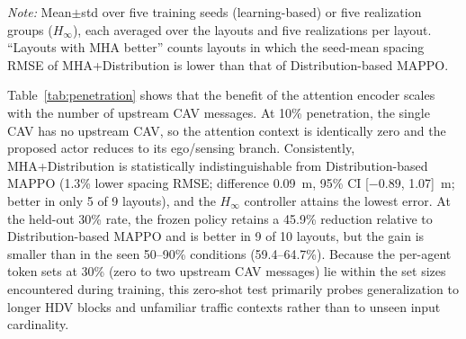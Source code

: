 \documentclass{ieeeaccess}
\begin{document}
\begin{table}[htbp]
\centering
\caption{Spacing RMSE (m) Across Seen and Zero-Shot CAV Penetration Rates (30\% Bernoulli Loss, Averaged over Layouts)}
\label{tab:penetration}
\setlength{\tabcolsep}{4pt}
\renewcommand{\arraystretch}{1.2}

\vspace{0.2cm}
{\raggedright
\footnotesize
\textit{Note:} Mean$\pm$std over five training seeds (learning-based) or five realization groups ($H_\infty$), each averaged over the layouts and five realizations per layout. ``Layouts with MHA better'' counts layouts in which the seed-mean spacing RMSE of MHA+Distribution is lower than that of Distribution-based MAPPO.
\par}
\end{table}

Table~\ref{tab:penetration} shows that the benefit of the attention encoder scales with the number of upstream CAV messages. At 10\% penetration, the single CAV has no upstream CAV, so the attention context is identically zero and the proposed actor reduces to its ego/sensing branch. Consistently, MHA+Distribution is statistically indistinguishable from Distribution-based MAPPO (1.3\% lower spacing RMSE; difference 0.09~m, 95\% CI [$-0.89$, 1.07]~m; better in only 5 of 9 layouts), and the $H_\infty$ controller attains the lowest error. At the held-out 30\% rate, the frozen policy retains a 45.9\% reduction relative to Distribution-based MAPPO and is better in 9 of 10 layouts, but the gain is smaller than in the seen 50--90\% conditions (59.4--64.7\%). Because the per-agent token sets at 30\% (zero to two upstream CAV messages) lie within the set sizes encountered during training, this zero-shot test primarily probes generalization to longer HDV blocks and unfamiliar traffic contexts rather than to unseen input cardinality. %
\end{document}
